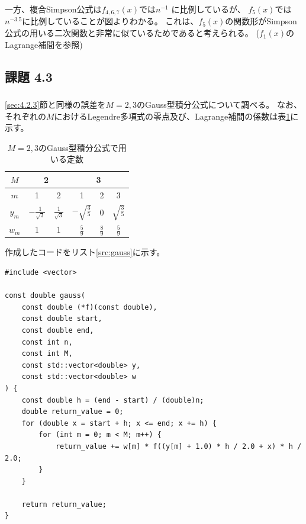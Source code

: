 \documentclass[a4j, titlepage]{jsarticle}
\numberwithin{equation}{section}
\begin{document}
                一方、複合Simpson公式は$f_{4,6,7}(x)$では$n^{-1}$
                に比例しているが、
                $f_5(x)$では$n^{-3.5}$に比例していることが図よりわかる。
                これは、$f_5(x)$の関数形がSimpson公式の用いる二次関数と非常に似ているためであると考えられる。
                ($f_1(x)$のLagrange補間を参照)

    \subsection{課題 4.3}
        \subsubsection{}
            \ref{sec:4.2.3}節と同様の誤差を$M=2,3$のGauss型積分公式について調べる。
            なお、それぞれの$M$におけるLegendre多項式の零点及び、Lagrange補間の係数は表\ref{tab:legendre}に示す。
            \begin{table}
                \caption{$M=2,3$のGauss型積分公式で用いる定数}
                \label{tab:legendre}
                \centering
                \begin{tabular}{c|cc|ccc} \hline
                    $M$ & \multicolumn{2}{c|}{2} & \multicolumn{3}{c}{3} \\ \hline
                    $m$ & 1 & 2 & 1 & 2 & 3 \\
                    $y_m$ & $\displaystyle-\frac{1}{\sqrt{3}}$ & $\displaystyle\frac{1}{\sqrt{3}}$ & $\displaystyle-\sqrt{\frac{3}{5}}$ & 0 & $\displaystyle\sqrt{\frac{3}{5}}$ \\
                    $w_m$ & 1 & 1 & $\displaystyle\frac{5}{9}$ & $\displaystyle\frac{8}{9}$ & $\displaystyle\frac{5}{9}$ \\ \hline
                \end{tabular}
            \end{table}

            作成したコードをリスト\ref{src:gauss}に示す。
            \begin{lstlisting}[caption=式(\ref{equ:gauss})の実装, label=src:gauss]
#include <vector>

const double gauss(
    const double (*f)(const double),
    const double start,
    const double end,
    const int n,
    const int M,
    const std::vector<double> y,
    const std::vector<double> w
) {
    const double h = (end - start) / (double)n;
    double return_value = 0;
    for (double x = start + h; x <= end; x += h) {
        for (int m = 0; m < M; m++) {
            return_value += w[m] * f((y[m] + 1.0) * h / 2.0 + x) * h / 2.0;
        }
    }

    return return_value;
}
            \end{lstlisting}
\end{document}

